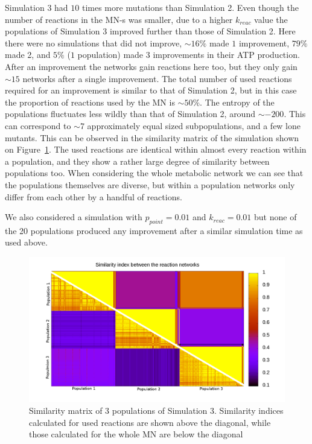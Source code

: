 \documentclass[10pt,a4paper]{article}
\begin{document}
Simulation 3 had $10$ times more mutations than Simulation 2. Even though the number of reactions in the MN-s was smaller, due to a higher $k_{reac}$ value the populations of Simulation 3 improved further than those of Simulation 2. Here there were no simulations that did not improve, $\sim 16\%$ made $1$ improvement, $79\%$ made 2, and $5\%$ ($1$ population) made $3$ improvements in their ATP production. After an improvement the networks gain reactions here too, but they only gain $\sim 15$ networks after a single improvement. The total number of used reactions required for an improvement is similar to that of Simulation 2, but in this case the proportion of reactions used by the MN is $\sim 50\%$. The entropy of the populations fluctuates less wildly than that of Simulation 2, around $\sim -200$. This can correspond to $\sim 7$ approximately equal sized subpopulations, and a few lone mutants. This can be observed in the similarity matrix of the simulation shown on Figure~\ref{fig:simmatrix_sim3}. The used reactions are identical within almost every reaction within a population, and they show a rather large degree of similarity between populations too. When considering the whole metabolic network we can see that the populations themselves are diverse, but within a population networks only differ from each other by a handful of reactions. 

We also considered a simulation with $p_{point}=0.01$ and $k_{reac}=0.01$ but none of the 20 populations produced any improvement after a similar simulation time as used above. 


\begin{figure}[htpb]
	\centering
	\includegraphics[width=0.8\linewidth]{simmatrix_sim3.png}
	\caption{Similarity matrix of 3 populations of Simulation 3. Similarity indices calculated for used reactions are shown above the diagonal, while those calculated for the whole MN are below the diagonal}
	\label{fig:simmatrix_sim3}
\end{figure}
\end{document}
